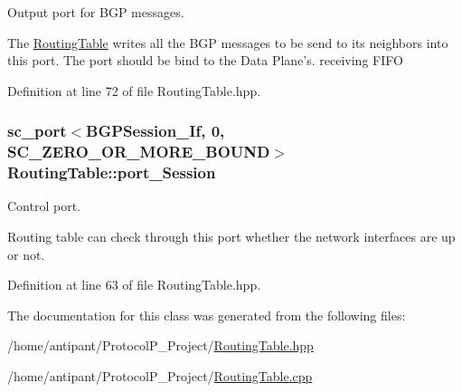 Output port for B\-G\-P messages. 

The \hyperlink{classRoutingTable}{Routing\-Table} writes all the B\-G\-P messages to be send to its neighbors into this port. The port should be bind to the Data Plane's. receiving F\-I\-F\-O 

Definition at line 72 of file Routing\-Table.\-hpp.

\hypertarget{classRoutingTable_af24047fc955ca1e81caee0468f70f62c}{
\subsubsection[{port\-\_\-\-Session}]{\setlength{\rightskip}{0pt plus 5cm}sc\-\_\-port$<${\bf B\-G\-P\-Session\-\_\-\-If}, 0, S\-C\-\_\-\-Z\-E\-R\-O\-\_\-\-O\-R\-\_\-\-M\-O\-R\-E\-\_\-\-B\-O\-U\-N\-D$>$ Routing\-Table\-::port\-\_\-\-Session}}\label{classRoutingTable_af24047fc955ca1e81caee0468f70f62c}


Control port. 

Routing table can check through this port whether the network interfaces are up or not. 

Definition at line 63 of file Routing\-Table.\-hpp.



The documentation for this class was generated from the following files\-:\begin{DoxyCompactItemize}
\item 
/home/antipant/\-Protocol\-P\-\_\-\-Project/\hyperlink{RoutingTable_8hpp}{Routing\-Table.\-hpp}\item 
/home/antipant/\-Protocol\-P\-\_\-\-Project/\hyperlink{RoutingTable_8cpp}{Routing\-Table.\-cpp}\end{DoxyCompactItemize}
